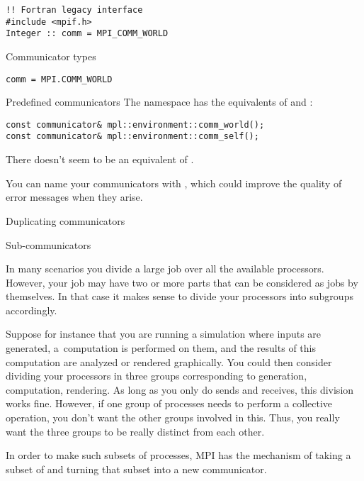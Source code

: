 \begin{lstlisting}
!! Fortran legacy interface
#include <mpif.h>
Integer :: comm = MPI_COMM_WORLD
\end{lstlisting}
\lstset{language=C}

\begin{pythonnote}{Communicator types}
\lstset{language=python}
\begin{lstlisting}
comm = MPI.COMM_WORLD
\end{lstlisting}
\end{pythonnote}

\begin{mplnote}{Predefined communicators}
  The  namespace has the equivalents
  of  and :
\begin{lstlisting}
const communicator& mpl::environment::comm_world();
const communicator& mpl::environment::comm_self();    
\end{lstlisting}
There doesn't seem to be an equivalent of .
\end{mplnote}

You can name your communicators with , which
could improve the quality of error messages when they arise.

 {Duplicating communicators}
\label{sec:comm-dup}



 {Sub-communicators}
\label{sec:communicators}

In many scenarios you divide a large job over all the available processors.
However, your job may have two or more parts that can be considered as
jobs by themselves. In that case it makes sense to divide your processors
into subgroups accordingly.

Suppose for instance that you are running a simulation where inputs are generated,
a~computation is performed on them, and the results of this computation
are analyzed or rendered graphically. You could then consider dividing your
processors in three groups corresponding to generation, computation, rendering.
%
As long as you only do sends and receives, this division works fine. However,
if one group of processes needs to perform a collective operation, you don't
want the other groups involved in this. Thus, you really want the three groups
to be really distinct from each other.

In order to make such subsets of processes, MPI has the mechanism of
taking a subset of  and turning that subset
into a new communicator.

